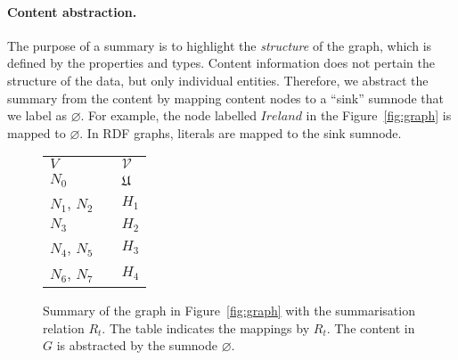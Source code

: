 \paragraph{Content abstraction.}

The purpose of a summary is to highlight the \emph{structure} of the graph, which is defined by the properties and types. Content information does not pertain the structure of the data, but only individual entities. Therefore, we abstract the summary from the content by mapping content nodes to a ``sink'' sumnode that we label as $\varnothing$. For example, the node labelled $Ireland$ in the Figure~\ref{fig:graph} is mapped to $\varnothing$. In RDF graphs, literals are mapped to the sink sumnode.

\begin{figure}
	\centering
	\begin{minipage}{.7\textwidth}
		\resizebox{\textwidth}{!}{
			
		}
	\end{minipage}
	\quad
	\begin{minipage}[h]{.25\textwidth}
		\centering
		\caption*{$R_t\left(V, \mathcal{V}\right)$}
		\begin{tabular}{lc@{\hs}l}
			\toprule
			$V$ & \phantom{a} & $\mathcal{V}$ \\
			\cmidrule{1-1} \cmidrule{3-3}
			$N_0$ & \phantom{a} & $\mathfrak{U}$ \\
			$N_1$, $N_2$ & \phantom{a} & $H_1$ \\
			$N_3$ & \phantom{a} & $H_2$ \\
			$N_4$, $N_5$ & \phantom{a} & $H_3$ \\
			$N_6$, $N_7$ & \phantom{a} & $H_4$ \\
			\bottomrule
		\end{tabular}
	\end{minipage}
	\caption{Summary of the graph in Figure~\ref{fig:graph} with the summarisation relation $R_t$. The table indicates the mappings by $R_t$. The content in $G$ is abstracted by the sumnode $\varnothing$.}
	\label{fig:classes-summary}
\end{figure}


